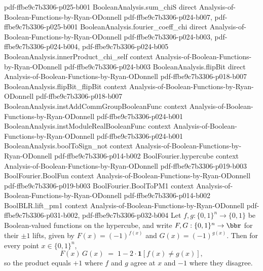 \begin{lemma}
  {pdf-ffbe9c7b3306-p025-b001}
\proofstep
  {BooleanAnalysis.sum_chiS}
  {direct}
  {Analysis-of-Boolean-Functions-by-Ryan-ODonnell}
  {pdf-ffbe9c7b3306-p024-b007,
    pdf-ffbe9c7b3306-p025-b001}
\proofstep
  {BooleanAnalysis.fourier_coeff_chi}
  {direct}
  {Analysis-of-Boolean-Functions-by-Ryan-ODonnell}
  {pdf-ffbe9c7b3306-p024-b003,
    pdf-ffbe9c7b3306-p024-b004,
    pdf-ffbe9c7b3306-p024-b005}
\proofstep
  {BooleanAnalysis.innerProduct_chi_self}
  {context}
  {Analysis-of-Boolean-Functions-by-Ryan-ODonnell}
  {pdf-ffbe9c7b3306-p024-b003}
\proofstep
  {BooleanAnalysis.flipBit}
  {direct}
  {Analysis-of-Boolean-Functions-by-Ryan-ODonnell}
  {pdf-ffbe9c7b3306-p018-b007}
\proofstep
  {BooleanAnalysis.flipBit_flipBit}
  {context}
  {Analysis-of-Boolean-Functions-by-Ryan-ODonnell}
  {pdf-ffbe9c7b3306-p018-b007}
\proofstep
  {BooleanAnalysis.instAddCommGroupBooleanFunc}
  {context}
  {Analysis-of-Boolean-Functions-by-Ryan-ODonnell}
  {pdf-ffbe9c7b3306-p024-b001}
\proofstep
  {BooleanAnalysis.instModuleRealBooleanFunc}
  {context}
  {Analysis-of-Boolean-Functions-by-Ryan-ODonnell}
  {pdf-ffbe9c7b3306-p024-b001}
\proofstep
  {BooleanAnalysis.boolToSign_not}
  {context}
  {Analysis-of-Boolean-Functions-by-Ryan-ODonnell}
  {pdf-ffbe9c7b3306-p014-b002}
\proofstep
  {BoolFourier.hypercube}
  {context}
  {Analysis-of-Boolean-Functions-by-Ryan-ODonnell}
  {pdf-ffbe9c7b3306-p019-b003}
\proofstep
  {BoolFourier.BoolFun}
  {context}
  {Analysis-of-Boolean-Functions-by-Ryan-ODonnell}
  {pdf-ffbe9c7b3306-p019-b003}
\proofstep
  {BoolFourier.BoolToPM1}
  {context}
  {Analysis-of-Boolean-Functions-by-Ryan-ODonnell}
  {pdf-ffbe9c7b3306-p014-b002}
\proofstep
  {BoolBLR.lift_pm1}
  {context}
  {Analysis-of-Boolean-Functions-by-Ryan-ODonnell}
  {pdf-ffbe9c7b3306-p031-b002,
    pdf-ffbe9c7b3306-p032-b004}
Let $f, g : \{0,1\}^n \to \{0,1\}$ be Boolean-valued functions on the hypercube, and
write $F, G : \{0,1\}^n \to \bbr$ for their $\pm 1$ lifts, given by $F(x) = (-1)^{f(x)}$
and $G(x) = (-1)^{g(x)}$. Then for every point $x \in \{0,1\}^n$,
\[
  F(x)\,G(x) \;=\; 1 - 2\cdot\mathbf{1}\!\left[f(x) \ne g(x)\right],
\]
so the product equals $+1$ where $f$ and $g$ agree at $x$ and $-1$ where they disagree.
\end{lemma}

